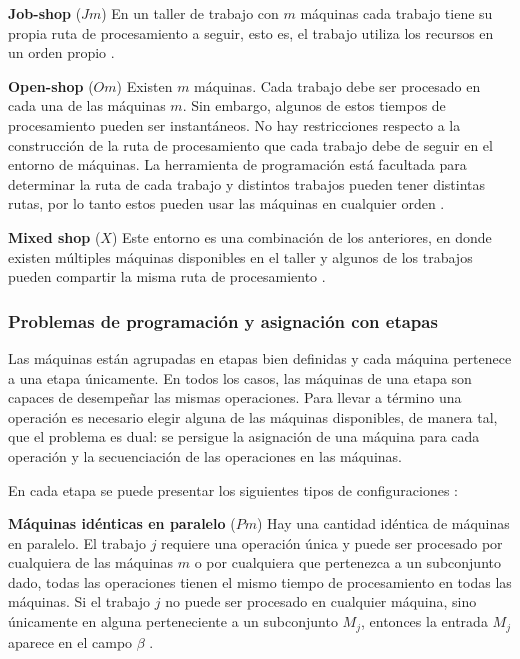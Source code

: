 \documentclass[spanish,draft,12pt,headsepline,footsepline,paper=letter]{scrreprt}
\begin{document}
\textbf{Job-shop} ($Jm$) En un taller de trabajo con $m$ máquinas cada trabajo tiene su propia ruta de procesamiento a seguir, esto es, el trabajo utiliza los recursos en un orden propio \citep[p.~8, p.~15]{TKindt2002,Pinedo1995}.

\textbf{Open-shop} ($Om$) Existen $m$ máquinas. Cada trabajo debe ser procesado en cada una de las máquinas $m$. Sin embargo, algunos de estos tiempos de procesamiento pueden ser instantáneos. No hay restricciones respecto a la construcción de la ruta de procesamiento que cada trabajo debe de seguir en el entorno de máquinas. La herramienta de programación está facultada para determinar la ruta de cada trabajo y distintos trabajos pueden tener distintas rutas, por lo tanto estos pueden usar las máquinas en cualquier orden \citep[p.~8, p.~15]{TKindt2002,Pinedo1995}.

\textbf{Mixed shop} ($X$) Este entorno es una combinación de los anteriores, en donde existen múltiples máquinas disponibles en el taller y algunos de los trabajos pueden compartir la misma ruta de procesamiento \citep[p.~8]{TKindt2002}.

\subsubsection{Problemas de programación y asignación con etapas}

Las máquinas están agrupadas en etapas bien definidas y cada máquina pertenece a una etapa únicamente. En todos los casos, las máquinas de una etapa son capaces de desempeñar las mismas operaciones. Para llevar a término una operación es necesario elegir alguna de las máquinas disponibles, de manera tal, que el problema es dual: se persigue la asignación de una máquina para cada operación y la secuenciación de las operaciones en las máquinas.

En cada etapa se puede presentar los siguientes tipos de configuraciones \citep[p.~8]{TKindt2002}:

\textbf{Máquinas idénticas en paralelo} ($Pm$) Hay una cantidad idéntica de máquinas en paralelo. El trabajo $j$ requiere una operación única y puede ser procesado por cualquiera de las máquinas $m$ o por cualquiera que pertenezca a un subconjunto dado, todas las operaciones tienen el mismo tiempo de procesamiento en todas las máquinas. Si el trabajo $j$ no puede ser procesado en cualquier máquina, sino únicamente en alguna perteneciente a un subconjunto $M_j$, entonces la entrada $M_j$ aparece en el campo $\beta$ \citep[p.~14, p.~8]{Pinedo1995,TKindt2002}.
\end{document}
